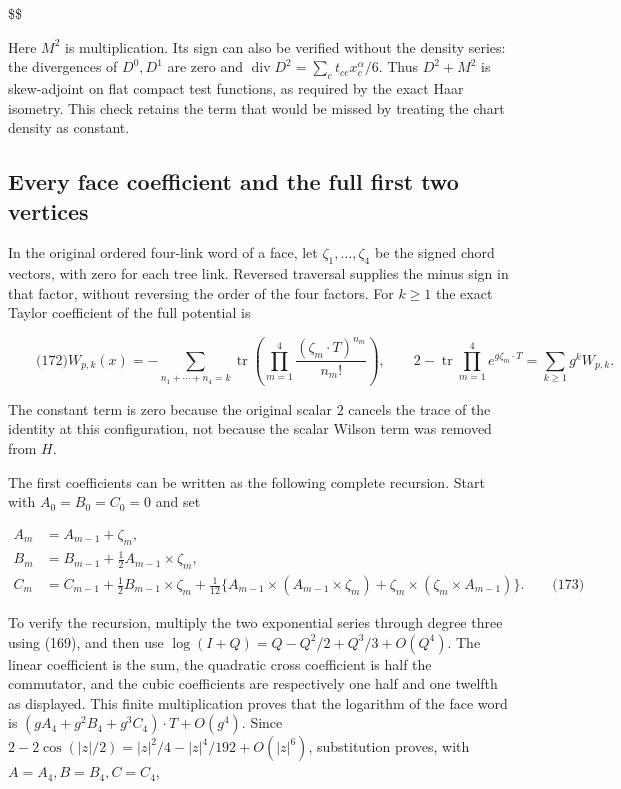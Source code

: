 \$\$

Here \(M^2\) is multiplication. Its sign can also be verified without
the density series: the divergences of \(D^0,D^1\) are zero and
\(\operatorname{div}D^2=\sum_ct_{ce}x_c^\alpha/6\). Thus \(D^2+M^2\) is
skew-adjoint on flat compact test functions, as required by the exact
Haar isometry. This check retains the term that would be missed by
treating the chart density as constant.

\subsection{Every face coefficient and the full first two
vertices}\label{nonabelian-vertex-md-every-face-coefficient-and-the-full-first-two-vertices}

In the original ordered four-link word of a face, let
\(\zeta_1,\ldots,\zeta_4\) be the signed chord vectors, with zero for
each tree link. Reversed traversal supplies the minus sign in that
factor, without reversing the order of the four factors. For \(k\ge1\)
the exact Taylor coefficient of the full potential is

\[
\qquad\text{(172)}
 W_{p,k}(x)=-\sum_{n_1+\cdots+n_4=k}
       \operatorname{tr}\!\left(\prod_{m=1}^4
                   \frac{(\zeta_m\cdot T)^{n_m}}{n_m!}\right),
 \qquad 2-\operatorname{tr}\prod_{m=1}^4 e^{g\zeta_m\cdot T}
           =\sum_{k\ge1}g^kW_{p,k}.
\]

The constant term is zero because the original scalar \(2\) cancels the
trace of the identity at this configuration, not because the scalar
Wilson term was removed from \(H\).

The first coefficients can be written as the following complete
recursion. Start with \(A_0=B_0=C_0=0\) and set

\[
\begin{aligned}
 A_m&=A_{m-1}+\zeta_m,\\
 B_m&=B_{m-1}+\tfrac12 A_{m-1}\times\zeta_m,\\
 C_m&=C_{m-1}+\tfrac12 B_{m-1}\times\zeta_m
   +\tfrac1{12}\{A_{m-1}\times(A_{m-1}\times\zeta_m)
          +\zeta_m\times(\zeta_m\times A_{m-1})\}.
       \qquad\text{(173)}
\end{aligned}
\]

To verify the recursion, multiply the two exponential series through
degree three using (169), and then use
\(\log(I+Q)=Q-Q^2/2+Q^3/3+O(Q^4)\). The linear coefficient is the sum,
the quadratic cross coefficient is half the commutator, and the cubic
coefficients are respectively one half and one twelfth as displayed.
This finite multiplication proves that the logarithm of the face word is
\((gA_4+g^2B_4+g^3C_4)\cdot T+O(g^4)\). Since
\(2-2\cos(|z|/2)=|z|^2/4-|z|^4/192+O(|z|^6)\), substitution proves, with
\(A=A_4,B=B_4,C=C_4\),

